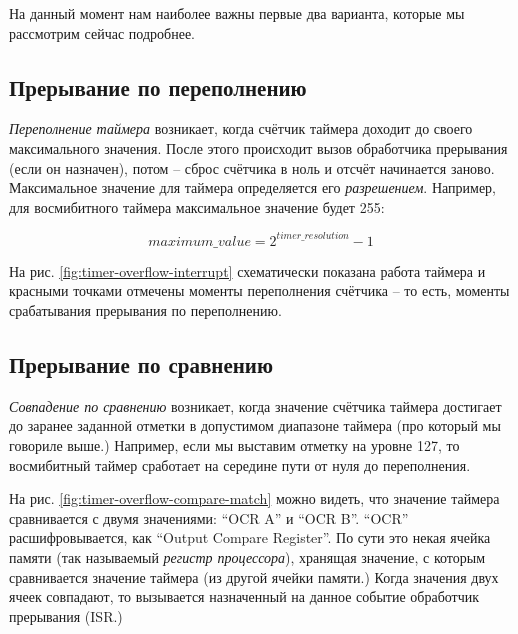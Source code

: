 \documentclass[../sparc.tex]{subfiles}
\begin{document}
На данный момент нам наиболее важны первые два варианта, которые мы рассмотрим
сейчас подробнее.

\subsection{Прерывание по переполнению}


\emph{Переполнение таймера} возникает, когда счётчик таймера доходит до своего
максимального значения.  После этого происходит вызов обработчика прерывания
(если он назначен), потом -- сброс счётчика в ноль и отсчёт начинается заново.
Максимальное значение для таймера определяется его \emph{разрешением}.
Например, для восмибитного таймера максимальное значение будет 255:

\begin{equation}
  maximum\_value = 2^{timer\_resolution} - 1
\end{equation}

На рис. \ref{fig:timer-overflow-interrupt} схематически показана работа таймера
и красными точками отмечены моменты переполнения счётчика -- то есть, моменты
срабатывания прерывания по переполнению.

\subsection{Прерывание по сравнению}


\emph{Совпадение по сравнению} возникает, когда значение счётчика таймера
достигает до заранее заданной отметки в допустимом диапазоне таймера (про
который мы говориле выше.)  Например, если мы выставим отметку на уровне 127, то
восмибитный таймер сработает на середине пути от нуля до переполнения.


На рис. \ref{fig:timer-overflow-compare-match} можно видеть, что значение
таймера сравнивается с двумя значениями: ``OCR A'' и ``OCR B''. ``OCR''
расшифровывается, как ``Output Compare Register''.  По сути это некая ячейка
памяти (так называемый \emph{регистр процессора}), хранящая значение, с которым
сравнивается значение таймера (из другой ячейки памяти.)  Когда значения двух
ячеек совпадают, то вызывается назначенный на данное событие обработчик
прерывания (\gls{ISR}.)
\end{document}
